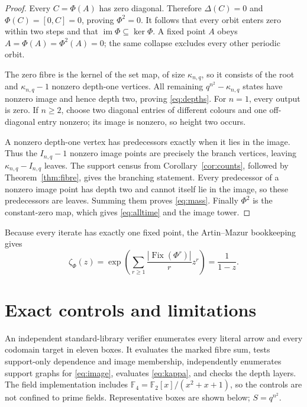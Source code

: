 \documentclass[a4paper,10pt]{amsart}
\theoremstyle{remark}
\newcommand{\F}{\mathbb F}
\newcommand{\im}{\operatorname{im}}
\newcommand{\Fix}{\operatorname{Fix}}
\begin{document}
\begin{proof}
Every $C=\Phi(A)$ has zero diagonal.  Therefore $\Delta(C)=0$ and
$\Phi(C)=[0,C]=0$, proving $\Phi^2=0$.  It follows that every orbit enters
zero within two steps and that $\im\Phi\subseteq\ker\Phi$.  A fixed point
$A$ obeys $A=\Phi(A)=\Phi^2(A)=0$; the same collapse excludes every other
periodic orbit.

The zero fibre is the kernel of the set map, of size $\kappa_{n,q}$, so it
consists of the root and $\kappa_{n,q}-1$ nonzero depth-one vertices.  All
remaining $q^{n^2}-\kappa_{n,q}$ states have nonzero image and hence depth
two, proving \eqref{eq:depths}.  For $n=1$, every output is zero.  If
$n\ge2$, choose two diagonal entries of different colours and one
off-diagonal entry nonzero; its image is nonzero, so height two occurs.

A nonzero depth-one vertex has predecessors exactly when it lies in the
image.  Thus the $I_{n,q}-1$ nonzero image points are precisely the branch
vertices, leaving $\kappa_{n,q}-I_{n,q}$ leaves.  The support census from
Corollary~\ref{cor:counts}, followed by Theorem~\ref{thm:fibre}, gives the
branching statement.  Every predecessor of a nonzero image point has depth
two and cannot itself lie in the image, so these predecessors are leaves.
Summing them proves \eqref{eq:mass}.  Finally $\Phi^2$ is the constant-zero
map, which gives \eqref{eq:alltime} and the image tower.
\end{proof}

Because every iterate has exactly one fixed point, the Artin--Mazur
bookkeeping \cite{ArtinMazur1965} gives
\begin{equation}\label{eq:zeta}
 \zeta_\Phi(z)=\exp\!\left(\sum_{r\ge1}
 \frac{|\Fix(\Phi^r)|}{r}z^r\right)=\frac1{1-z}.
\end{equation}

\section{Exact controls and limitations}

An independent standard-library verifier enumerates every literal arrow and
every codomain target in eleven boxes.  It evaluates the marked fibre sum,
tests support-only dependence and image membership, independently enumerates
support graphs for \eqref{eq:image}, evaluates \eqref{eq:kappa}, and checks
the depth layers.  The field implementation includes
$\F_4=\F_2[x]/(x^2+x+1)$, so the controls are not confined to prime fields.
Representative boxes are shown below; $S=q^{n^2}$.
\end{document}
